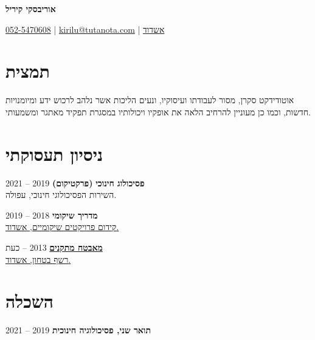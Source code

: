 \documentclass[
	12pt,a4paper %
]{article}
\begin{document}
\setRTL
\begin{hebrew}

	\begin{center}
		{\Huge{\textbf{אוריבסקי קיריל}}}

		\vspace{2pt}
		\colorbox{shade}{ %
			 \href{tel:972525470608}{052-5470608} \raisebox{-1pt}{\faPhone} |  \href{mailto:kirilu@tutanota.com}{kirilu@tutanota.com} \raisebox{0pt}{\small\faEnvelope} | \href{https://goo.gl/maps/MSacjpSy7vZSKykP7}{אשדוד} \raisebox{0pt}{\faHome}
		}
	\end{center}
	\section{תמצית}
	אוטודידקט סקרן, מסור לעבודתו ועיסוקיו, ונעים הליכות אשר נלהב לרכוש ידע ומיומנויות חדשות, וכמו כן מעוניין להרחיב הלאה את אופקיו ויכולותיו במסגרת תפקיד מאתגר ומשמעותי.
	\section{ניסיון תעסוקתי}

	\textbf{\large פסיכולוג חינוכי} \textbf{(פרקטיקום)} \hfill 2019 -- 2021 \\
	{השירות הפסיכולוגי חינוכי, עפולה.}

	\noindent\dotfill %

	\noindent\textbf{\large מדריך שיקומי} \hfill 2018 -- 2019 \\
	\href{http://www.kidumpro.co.il/}{ קידום פרויקטים שיקומיים, אשדוד.}

	\noindent\dotfill %

	\noindent\href{https://loona-il.000webhostapp.com/resume-references/recommendation-letter-security-guard.jpg}{\large \textbf{מאבטח מתקנים}} \hfill 2013 -- כעת \\
	\href{https://loona-il.000webhostapp.com/resume-references/recommendation-letter-security-guard.jpg}{רשף בטחון, אשדוד.}

	\section{השכלה}

	\textbf{\large תואר שני, פסיכולוגיה חינוכית} \hfill 2019 -- 2021


\end{hebrew}
\end{document}
